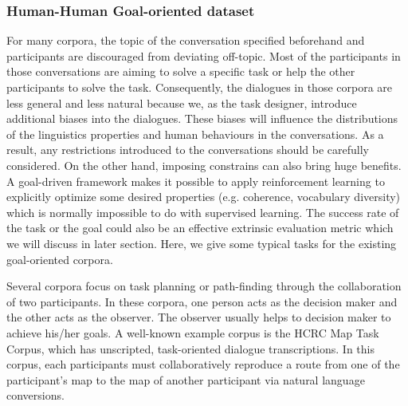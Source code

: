 \documentclass[bsc,frontabs,twoside,singlespacing,parskip,deptreport]{infthesis}     %
\begin{document}

\subsubsection*{Human-Human Goal-oriented dataset}

For many corpora, the topic of the conversation specified beforehand and participants are discouraged from deviating off-topic. Most of the participants in those conversations are aiming to solve a specific task or help the other participants to solve the task. Consequently, the dialogues in those corpora are less general and less natural because we, as the task designer, introduce additional biases into the dialogues. These biases will influence the distributions of the linguistics properties and human behaviours in the conversations. As a result, any restrictions introduced to the conversations should be carefully considered. On the other hand, imposing constrains can also bring huge benefits. A goal-driven framework makes it possible to apply reinforcement learning to explicitly optimize some desired properties (e.g. coherence, vocabulary diversity) which is normally impossible to do with supervised learning\cite{jurafsky2019speech}. The success rate of the task or the goal could also be an effective extrinsic evaluation metric which we will discuss in later section. Here, we give some typical tasks for the existing goal-oriented corpora.

Several corpora focus on task planning or path-finding through the collaboration of two participants. In these corpora, one person acts as the decision maker and the other acts as the observer. The observer usually helps to decision maker to achieve his/her goals. A well-known example corpus is the HCRC Map Task Corpus\cite{anderson1991hcrc}, which has unscripted, task-oriented dialogue transcriptions. In this corpus, each participants must collaboratively reproduce a route from one of the participant’s map to the map of another participant via natural language conversions. 
\end{document}
